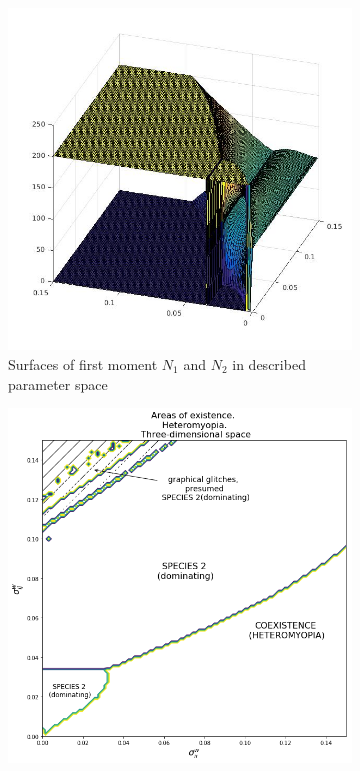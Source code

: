 \documentclass[%
 aip,
rsi,%
 amsmath,amssymb,
 reprint,%
]{revtex4-1}
\begin{document}
\begin{figure}[ht]
	\centering
	\begin{subfigure}{.5\textwidth}
		\centering
		\includegraphics[width=.93\linewidth]{N1N2hm08D3.jpg}
		\caption{Surfaces of first moment \(N_1\) and \(N_2\) in described parameter space}
		\label{fig:hmd3:sub1}
	\end{subfigure}%
	\begin{subfigure}{.5\textwidth}
		\centering
		\includegraphics[width=.93\linewidth]{arhm08d3.png}

\end{subfigure}
\end{figure}
\end{document}
